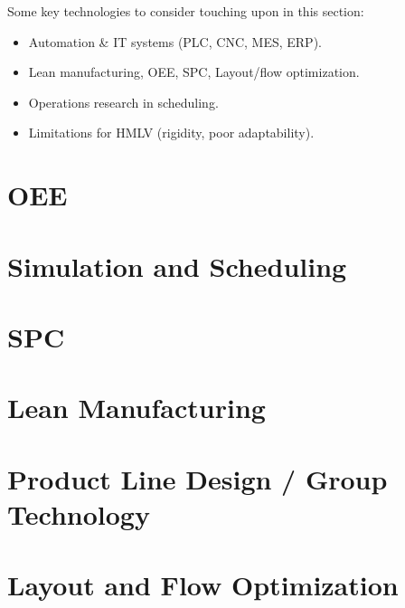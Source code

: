 Some key technologies to consider touching upon in this section:
\begin{itemize}
    \item Automation \& IT systems (PLC, CNC, MES, ERP).
    \item Lean manufacturing, OEE, SPC, Layout/flow optimization.
    \item Operations research in scheduling.
    \item Limitations for HMLV (rigidity, poor adaptability).
\end{itemize}

\section{OEE}\label{sec:oee}

\section{Simulation and Scheduling}\label{sec:simulation-and-scheduling}

\section{SPC}\label{sec:spc}

\section{Lean Manufacturing}\label{sec:lean-manufacturing}

\section{Product Line Design / Group Technology}\label{sec:product-line-design}

\section{Layout and Flow Optimization}\label{sec:layout-and-flow-optimization}